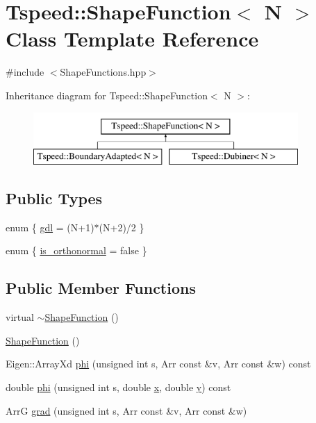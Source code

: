 \hypertarget{classTspeed_1_1ShapeFunction}{\section{Tspeed\-:\-:Shape\-Function$<$ N $>$ Class Template Reference}
\label{classTspeed_1_1ShapeFunction}
}


{\ttfamily \#include $<$Shape\-Functions.\-hpp$>$}

Inheritance diagram for Tspeed\-:\-:Shape\-Function$<$ N $>$\-:\begin{figure}[H]
\begin{center}
\leavevmode
\includegraphics[height=2.000000cm]{classTspeed_1_1ShapeFunction}
\end{center}
\end{figure}
\subsection*{Public Types}
\begin{DoxyCompactItemize}
\item 
enum \{ \hyperlink{classTspeed_1_1ShapeFunction_aae4b82bb304115736483f3549b135662a5000f7869288e4deef5af90732ca04fc}{gdl} = (N+1)$\ast$(N+2)/2
 \}
\item 
enum \{ \hyperlink{classTspeed_1_1ShapeFunction_ab93d04cd0692e117dffed761620d57c1a62f499700236320c9364d9c4bc9ab564}{is\-\_\-orthonormal} = false
 \}
\end{DoxyCompactItemize}
\subsection*{Public Member Functions}
\begin{DoxyCompactItemize}
\item 
virtual \hyperlink{classTspeed_1_1ShapeFunction_abfab4ad1f425751c62102f74f6ff8040}{$\sim$\-Shape\-Function} ()
\item 
\hyperlink{classTspeed_1_1ShapeFunction_ad445923bd9ccbd1c50580f43a6342f5c}{Shape\-Function} ()
\item 
Eigen\-::\-Array\-Xd \hyperlink{classTspeed_1_1ShapeFunction_a30886f42b86096f6ea4b621cd4255dd1}{phi} (unsigned int s, Arr const \&v, Arr const \&w) const 
\item 
double \hyperlink{classTspeed_1_1ShapeFunction_a45ca655484d81ea09b474ae628d79ecf}{phi} (unsigned int s, double \hyperlink{vtk__mesh__out_8m_ace4b66138f2e64832c951b1ba9ce24cc}{x}, double \hyperlink{vtk__mesh__out_8m_a2fb1c5cf58867b5bbc9a1b145a86f3a0}{y}) const 
\item 
Arr\-G \hyperlink{classTspeed_1_1ShapeFunction_aac13d9c4a86f3a2f9b188a199676c2da}{grad} (unsigned int s, Arr const \&v, Arr const \&w)
\end{DoxyCompactItemize}
